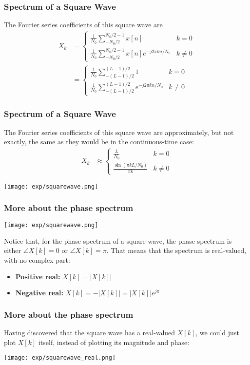 \documentclass{beamer}
\begin{document}
\begin{frame}
  \frametitle{Spectrum of a Square Wave}

  The Fourier series coefficients of this square wave are
  \begin{align*}
    X_k &= \begin{cases}
      \frac{1}{N_0}\sum_{-N_0/2}^{N_0/2-1} x[n] & k=0\\
      \frac{1}{N_0}\sum_{-N_0/2}^{N_0/2-1} x[n]e^{-j2\pi kn/N_0} & k\ne 0
    \end{cases}\\
    &= \begin{cases}
      \frac{1}{N_0}\sum_{-(L-1)/2}^{(L-1)/2}1 & k=0\\
      \frac{1}{N_0}\sum_{-(L-1)/2}^{(L-1)/2} e^{-j2\pi kn/N_0} & k\ne 0
    \end{cases}
  \end{align*}
\end{frame}

\begin{frame}
  \frametitle{Spectrum of a Square Wave}

  The Fourier series coefficients of this square wave are
  approximately, but not exactly, the same as they would be in the
  continuous-time case:
  \begin{align*}
    X_k&\approx \begin{cases}
      \frac{L}{N_0} & k=0\\
      \frac{\sin(\pi kL/N_0)}{\pi k} & k\ne 0
    \end{cases}
  \end{align*}
  \centerline{\texttt{[image: exp/squarewave.png]}}
\end{frame}

\begin{frame}
  \frametitle{More about the phase spectrum}
  \centerline{\texttt{[image: exp/squarewave.png]}}
  Notice that, for the phase spectrum of a square wave, the phase
  spectrum is either $\angle X[k]=0$ or $\angle X[k]=\pi$.  That means that the
  spectrum is real-valued, with no complex part:
  \begin{itemize}
  \item {\bf Positive real:} $X[k]=|X[k]|$
  \item {\bf Negative real:} $X[k]=-|X[k]| = |X[k]|e^{j\pi}$
  \end{itemize}
\end{frame}

\begin{frame}
  \frametitle{More about the phase spectrum}
  
  Having discovered that the square wave has a real-valued $X[k]$, we could
  just plot $X[k]$ itself, instead of plotting its magnitude and phase:
  \centerline{\texttt{[image: exp/squarewave\_real.png]}}
\end{frame}
\end{document}
